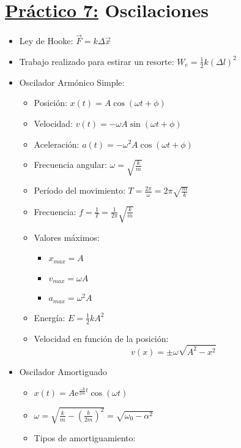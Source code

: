 \documentclass[12pt,a4paper]{article}
\begin{document}
	\section*{\underline{Práctico 7:} Oscilaciones}
		\begin{itemize}
			\item Ley de Hooke: $\vec{F} = k \Delta \vec{x}$
			\item Trabajo realizado para estirar un resorte: $W_{e} = \frac{1}{2} k (\Delta l)^{2}$
			\item Oscilador Armónico Simple:
				\begin{multicols}{2}
					\begin{itemize}
						\item Posición: $x(t) = A \cos (\omega t + \phi)$
						\item Velocidad: $v(t) = - \omega A \sin (\omega t + \phi)$
						\item Aceleración: $a(t) = - \omega^{2} A \cos (\omega t + \phi)$
						\item Frecuencia angular: $\omega = \sqrt{\frac{k}{m}}$
						\item Período del movimiento: $T = \frac{2\pi}{\omega} = 2\pi \sqrt{\frac{m}{k}}$
						\item Frecuencia: $f = \frac{1}{T} = \frac{1}{2\pi} \sqrt{\frac{k}{m}}$
						\item Valores máximos:
							\begin{itemize}
								\item $x_{max} = A$
								\item $v_{max} = \omega A$
								\item $a_{max} = \omega^{2}A$
							\end{itemize}
						\item Energía: $E = \frac{1}{2} k A^{2}$
						\item Velocidad en función de la posición:
							\[
								v(x) = \pm \omega \sqrt{A^{2} - x^{2}}
							\]
					\end{itemize}
				\end{multicols}
			\item Oscilador Amortiguado
				\begin{multicols}{2}
					\begin{itemize}
						\item $x(t) = A \mathrm{e}^{\frac{-b}{2m}t} \cos (\omega t)$
						\item $\omega = \sqrt{\frac{k}{m} - \left(\frac{b}{2m}\right)^{2}} = \sqrt{\omega_{0} - \alpha^{2}}$
						\item Tipos de amortiguamiento:

\end{itemize}
\end{multicols}
\end{itemize}
\end{document}
